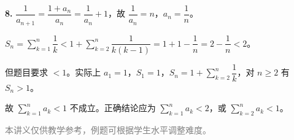 \documentclass[12pt, a4paper]{ctexart}
\begin{document}
\begin{knowledgebox}[参考答案]
\vspace{6pt}
\textbf{8.} $\dfrac{1}{a_{n+1}} = \dfrac{1+a_n}{a_n} = \dfrac{1}{a_n}+1$，故 $\dfrac{1}{a_n} = n$，$a_n = \dfrac{1}{n}$。

$S_n = \displaystyle\sum_{k=1}^{n}\dfrac{1}{k} < 1 + \displaystyle\sum_{k=2}^{n}\dfrac{1}{k(k-1)} = 1+1-\dfrac{1}{n} = 2-\dfrac{1}{n} < 2$。

但题目要求 $< 1$。实际上 $a_1 = 1$，$S_1 = 1$，$S_n = 1 + \displaystyle\sum_{k=2}^{n}\dfrac{1}{k}$，对 $n\geq 2$ 有 $S_n > 1$。

故 $\displaystyle\sum_{k=1}^{n}a_k < 1$ 不成立。正确结论应为 $\displaystyle\sum_{k=1}^{n}a_k < 2$，或 $\displaystyle\sum_{k=2}^{n}a_k < 1$。
\end{knowledgebox}

\vfill
\begin{center}
\small\textcolor{gray}{本讲义仅供教学参考，例题可根据学生水平调整难度。}
\end{center}
\end{document}
